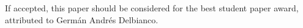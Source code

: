 

\begin{abstract}

\end{abstract}

\vfill

\begin{center}
  If accepted, this paper should be considered for the best student
  paper award,\\ attributed to Germ\'{a}n Andr\'{e}s Delbianco.
\end{center}
\vfill


